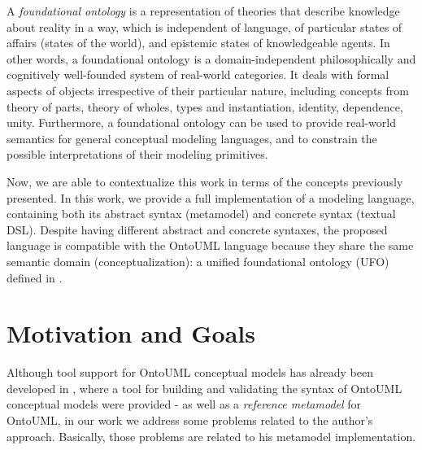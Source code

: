 \documentclass[
  10pt,				%
  oneside,
  a4paper,			%
  brazilian,
  english
]{abntex2}
\begin{document}
A \emph{foundational ontology} is a representation of theories that describe
knowledge about reality in a way, which is independent of language, of particular
states of affairs (states of the world), and epistemic states of knowledgeable agents.
In other words, a foundational ontology is a domain-independent philosophically
and cognitively well-founded system of real-world categories. It deals with formal
aspects of objects irrespective of their particular nature, including concepts
from theory of parts, theory of wholes, types and instantiation, identity,
dependence, unity. Furthermore, a foundational ontology can be used to provide
real-world semantics for general conceptual modeling languages, and to constrain
the possible interpretations of their modeling primitives. \cite{carraretto10}

Now, we are able to contextualize this work in terms of the concepts previously
presented.
%
%
In this work, we provide a full implementation of a modeling language, containing
both its abstract syntax (metamodel) and concrete syntax (textual DSL).
Despite having different abstract and concrete syntaxes, the proposed language is
compatible with the OntoUML language because they share the same semantic domain
(conceptualization): a unified foundational ontology (UFO) defined in \cite{guizzardi05}.

\section{Motivation and Goals}

Although tool support for OntoUML conceptual models has already been developed
in \cite{carraretto10}, where a tool for building and validating the syntax
of OntoUML conceptual models were provided - as well as a \emph{reference metamodel}
for OntoUML, in our work we address some problems related to the author’s approach.
%
Basically, those problems are related to his metamodel implementation.
\end{document}
